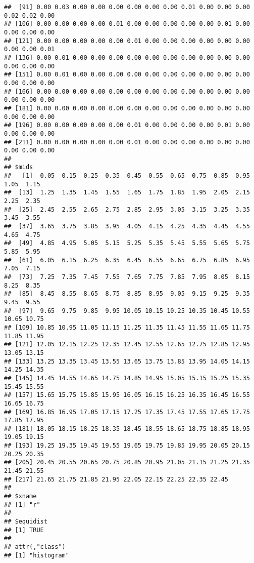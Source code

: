 \documentclass[
]{article}
\newenvironment{Shaded}{\begin{snugshade}}{\end{snugshade}}
\newcommand{\AttributeTok}[1]{\textcolor[rgb]{0.77,0.63,0.00}{#1}}
\newcommand{\CommentTok}[1]{\textcolor[rgb]{0.56,0.35,0.01}{\textit{#1}}}
\newcommand{\DecValTok}[1]{\textcolor[rgb]{0.00,0.00,0.81}{#1}}
\newcommand{\FunctionTok}[1]{\textcolor[rgb]{0.00,0.00,0.00}{#1}}
\newcommand{\NormalTok}[1]{#1}
\newcommand{\SpecialCharTok}[1]{\textcolor[rgb]{0.00,0.00,0.00}{#1}}
\newcommand{\StringTok}[1]{\textcolor[rgb]{0.31,0.60,0.02}{#1}}
\begin{document}
\begin{verbatim}
##  [91] 0.00 0.03 0.00 0.00 0.00 0.00 0.00 0.00 0.01 0.00 0.00 0.00 0.02 0.02 0.00
## [106] 0.00 0.00 0.00 0.00 0.01 0.00 0.00 0.00 0.00 0.00 0.01 0.00 0.00 0.00 0.00
## [121] 0.00 0.00 0.00 0.00 0.00 0.01 0.00 0.00 0.00 0.00 0.00 0.00 0.00 0.00 0.01
## [136] 0.00 0.01 0.00 0.00 0.00 0.00 0.00 0.00 0.00 0.00 0.00 0.00 0.00 0.00 0.00
## [151] 0.00 0.01 0.00 0.00 0.00 0.00 0.00 0.00 0.00 0.00 0.00 0.00 0.00 0.00 0.00
## [166] 0.00 0.00 0.00 0.00 0.00 0.00 0.00 0.00 0.00 0.00 0.00 0.00 0.00 0.00 0.00
## [181] 0.00 0.00 0.00 0.00 0.00 0.00 0.00 0.00 0.00 0.00 0.00 0.00 0.00 0.00 0.00
## [196] 0.00 0.00 0.00 0.00 0.00 0.01 0.00 0.00 0.00 0.00 0.01 0.00 0.00 0.00 0.00
## [211] 0.00 0.00 0.00 0.00 0.00 0.01 0.00 0.00 0.00 0.00 0.00 0.00 0.00 0.00 0.00
## 
## $mids
##   [1]  0.05  0.15  0.25  0.35  0.45  0.55  0.65  0.75  0.85  0.95  1.05  1.15
##  [13]  1.25  1.35  1.45  1.55  1.65  1.75  1.85  1.95  2.05  2.15  2.25  2.35
##  [25]  2.45  2.55  2.65  2.75  2.85  2.95  3.05  3.15  3.25  3.35  3.45  3.55
##  [37]  3.65  3.75  3.85  3.95  4.05  4.15  4.25  4.35  4.45  4.55  4.65  4.75
##  [49]  4.85  4.95  5.05  5.15  5.25  5.35  5.45  5.55  5.65  5.75  5.85  5.95
##  [61]  6.05  6.15  6.25  6.35  6.45  6.55  6.65  6.75  6.85  6.95  7.05  7.15
##  [73]  7.25  7.35  7.45  7.55  7.65  7.75  7.85  7.95  8.05  8.15  8.25  8.35
##  [85]  8.45  8.55  8.65  8.75  8.85  8.95  9.05  9.15  9.25  9.35  9.45  9.55
##  [97]  9.65  9.75  9.85  9.95 10.05 10.15 10.25 10.35 10.45 10.55 10.65 10.75
## [109] 10.85 10.95 11.05 11.15 11.25 11.35 11.45 11.55 11.65 11.75 11.85 11.95
## [121] 12.05 12.15 12.25 12.35 12.45 12.55 12.65 12.75 12.85 12.95 13.05 13.15
## [133] 13.25 13.35 13.45 13.55 13.65 13.75 13.85 13.95 14.05 14.15 14.25 14.35
## [145] 14.45 14.55 14.65 14.75 14.85 14.95 15.05 15.15 15.25 15.35 15.45 15.55
## [157] 15.65 15.75 15.85 15.95 16.05 16.15 16.25 16.35 16.45 16.55 16.65 16.75
## [169] 16.85 16.95 17.05 17.15 17.25 17.35 17.45 17.55 17.65 17.75 17.85 17.95
## [181] 18.05 18.15 18.25 18.35 18.45 18.55 18.65 18.75 18.85 18.95 19.05 19.15
## [193] 19.25 19.35 19.45 19.55 19.65 19.75 19.85 19.95 20.05 20.15 20.25 20.35
## [205] 20.45 20.55 20.65 20.75 20.85 20.95 21.05 21.15 21.25 21.35 21.45 21.55
## [217] 21.65 21.75 21.85 21.95 22.05 22.15 22.25 22.35 22.45
## 
## $xname
## [1] "r"
## 
## $equidist
## [1] TRUE
## 
## attr(,"class")
## [1] "histogram"
\end{verbatim}

\begin{Shaded}
\end{Shaded}
\end{document}
